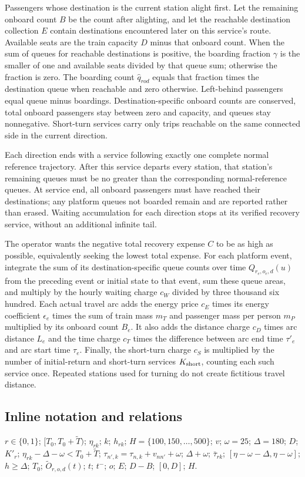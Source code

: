 \documentclass[10pt]{article}
\begin{document}
Passengers whose destination is the current station alight first. Let the remaining onboard count $B$ be the count after alighting, and let the reachable destination collection $E$ contain destinations encountered later on this service's route. Available seats are the train capacity $D$ minus that onboard count. When the sum of queues for reachable destinations is positive, the boarding fraction $\gamma$ is the smaller of one and available seats divided by that queue sum; otherwise the fraction is zero. The boarding count $\widehat q_{rod}$ equals that fraction times the destination queue when reachable and zero otherwise. Left-behind passengers equal queue minus boardings. Destination-specific onboard counts are conserved, total onboard passengers stay between zero and capacity, and queues stay nonnegative. Short-turn services carry only trips reachable on the same connected side in the current direction.

Each direction ends with a service following exactly one complete normal reference trajectory. After this service departs every station, that station's remaining queues must be no greater than the corresponding normal-reference queues. At service end, all onboard passengers must have reached their destinations; any platform queues not boarded remain and are reported rather than erased. Waiting accumulation for each direction stops at its verified recovery service, without an additional infinite tail.

The operator wants the negative total recovery expense $C$ to be as high as possible, equivalently seeking the lowest total expense. For each platform event, integrate the sum of its destination-specific queue counts over time $Q_{r_e,o_e,d}(u)$ from the preceding event or initial state to that event, sum these queue areas, and multiply by the hourly waiting charge $c_W$ divided by three thousand six hundred. Each actual travel arc adds the energy price $c_E$ times its energy coefficient $\epsilon_e$ times the sum of train mass $m_T$ and passenger mass per person $m_P$ multiplied by its onboard count $B_e$. It also adds the distance charge $c_D$ times arc distance $L_e$ and the time charge $c_T$ times the difference between arc end time $\tau'_e$ and arc start time $\tau_e$. Finally, the short-turn charge $c_S$ is multiplied by the number of initial-return and short-turn services $K_{\rm short}$, counting each such service once. Repeated stations used for turning do not create fictitious travel distance.

\subsection*{Inline notation and relations}
$r\in\{0,1\}$; $[T_0,T_0+\widetilde T)$; $\eta_{rk}$; $k$; $h_{rk}$; $H=\{100,150,\ldots,500\}$; $v$; $\omega=25$; $\Delta=180$; $D$; $K'_r$; $\eta_{rk}-\Delta-\omega<T_0+\widetilde T$; $\tau_{n',k}=\tau_{n,k}+v_{nn'}+\omega$; $\Delta+\omega$; $\bar\tau_{rk}$; $[\eta-\omega-\Delta,\eta-\omega]$; $h\ge\Delta$; $T_0$; $\widetilde O_{r,o,d}(t)$; $t$; $t^-$; $o$; $E$; $D-B$; $[0,D]$; $H$.
\end{document}
